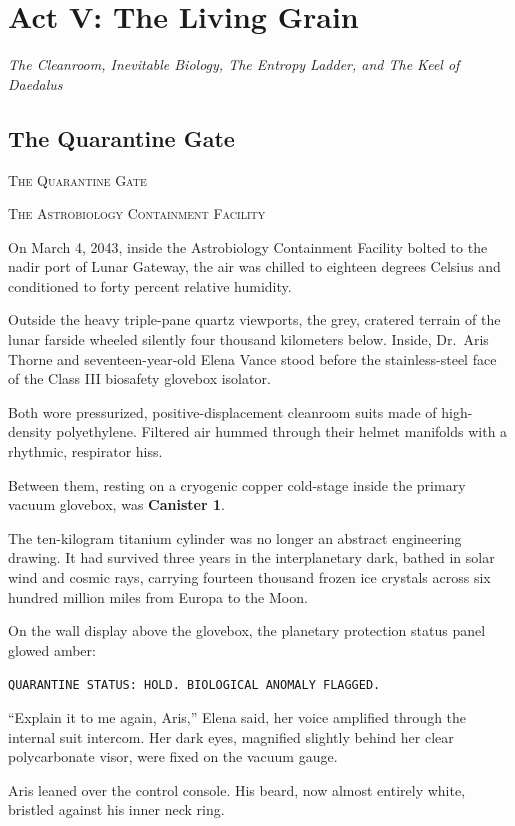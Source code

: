 \documentclass[12pt,twoside,openright]{book}
\newcommand{\sceneheader}[1]{%
  \par\vspace{1.8em}%
  {\noindent\centering\scshape\large #1\par}%
  \vspace{1.0em}%
  \noindent%
}
\begin{document}
\cleardoublepage
\part{Act V: The Living Grain}
\begin{center}\large\itshape The Cleanroom, Inevitable Biology, The Entropy Ladder, and The Keel of Daedalus\end{center}
\vspace*{30pt}
\chapter{The Quarantine Gate}
\sceneheader{The Quarantine Gate}

\sceneheader{The Astrobiology Containment
Facility}

On March 4, 2043, inside the Astrobiology Containment Facility bolted to
the nadir port of Lunar Gateway, the air was chilled to eighteen degrees
Celsius and conditioned to forty percent relative humidity.

Outside the heavy triple-pane quartz viewports, the grey, cratered
terrain of the lunar farside wheeled silently four thousand kilometers
below. Inside, Dr.~Aris Thorne and seventeen-year-old Elena Vance stood
before the stainless-steel face of the Class III biosafety glovebox
isolator.

Both wore pressurized, positive-displacement cleanroom suits made of
high-density polyethylene. Filtered air hummed through their helmet
manifolds with a rhythmic, respirator hiss.

Between them, resting on a cryogenic copper cold-stage inside the
primary vacuum glovebox, was \textbf{Canister 1}.

The ten-kilogram titanium cylinder was no longer an abstract engineering
drawing. It had survived three years in the interplanetary dark, bathed
in solar wind and cosmic rays, carrying fourteen thousand frozen ice
crystals across six hundred million miles from Europa to the Moon.

On the wall display above the glovebox, the planetary protection status
panel glowed amber:

\passthrough{\lstinline!QUARANTINE STATUS: HOLD. BIOLOGICAL ANOMALY FLAGGED.!}

``Explain it to me again, Aris,'' Elena said, her voice amplified
through the internal suit intercom. Her dark eyes, magnified slightly
behind her clear polycarbonate visor, were fixed on the vacuum gauge.

Aris leaned over the control console. His beard, now almost entirely
white, bristled against his inner neck ring.
\end{document}
